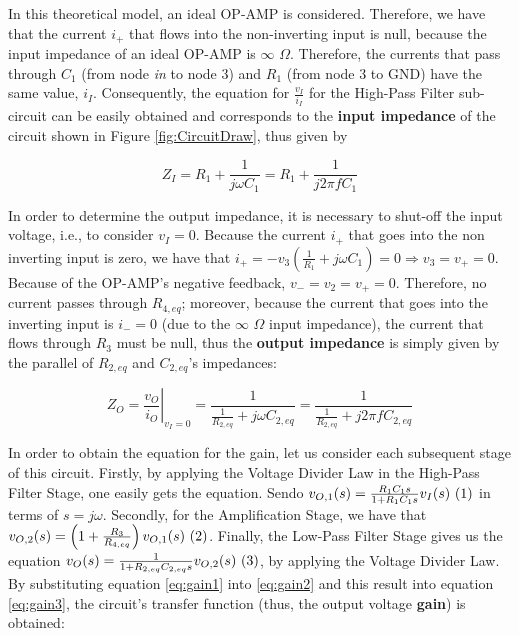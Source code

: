 \par

In this theoretical model, an ideal OP-AMP is considered. Therefore, we have that the current $i_+$ that flows into the non-inverting input is null, because the input impedance of an ideal OP-AMP is $\infty$ $\Omega$. Therefore, the currents that pass through $C_1$ (from node \textit{in} to node 3) and $R_1$ (from node 3 to GND) have the same value, $i_I$. Consequently, the equation for $\frac{v_I}{i_I}$ for the High-Pass Filter sub-circuit can be easily obtained and corresponds to the \textbf{input impedance} of the circuit shown in Figure \ref{fig:CircuitDraw}, thus given by

\begin{equation} \label{eq:input_impedance}
  Z_I=R_1+\frac{1}{j\omega C_1}=R_1+\frac{1}{j2\pi fC_1}
\end{equation}

In order to determine the output impedance, it is necessary to shut-off the input voltage, i.e., to consider $v_I=0$. Because the current $i_+$ that goes into the non inverting input is zero, we have that $i_+=-v_3\left(\frac{1}{R_1}+j\omega C_1\right)=0\Rightarrow v_3=v_+=0$. Because of the OP-AMP's negative feedback, $v_-=v_2=v_+=0$. Therefore, no current passes through $R_{4,eq}$; moreover, because the current that goes into the inverting input is $i_-=0$ (due to the $\infty$ $\Omega$ input impedance), the current that flows through $R_3$ must be null, thus the \textbf{output impedance} is simply given by the parallel of $R_{2,eq}$ and $C_{2,eq}$'s impedances:

\begin{equation} \label{eq:output_impedance}
  Z_O=\left.\frac{v_O}{i_O}\right|_{v_I=0}=\frac{1}{\frac{1}{R_{2,eq}}+j\omega C_{2,eq}}=\frac{1}{\frac{1}{R_{2,eq}}+j2\pi fC_{2,eq}}
\end{equation}

In order to obtain the equation for the gain, let us consider each subsequent stage of this circuit. Firstly, by applying the Voltage Divider Law in the High-Pass Filter Stage, one easily gets the equation. Sendo $v_{O,1}(s)=\frac{R_1C_1s}{1+R_1C_1s}v_I(s)~\refstepcounter{equation}(\theequation) \label{eq:gain1}$ in terms of $s=j\omega$. Secondly, for the Amplification Stage, we have that $v_{O,2}(s)=\left(1+\frac{R_3}{R_{4,eq}}\right)v_{O,1}(s)~\refstepcounter{equation}(\theequation) \label{eq:gain2}$. Finally, the Low-Pass Filter Stage gives us the equation $v_O(s)=\frac{1}{1+R_{2,eq}C_{2,eq}s}v_{O,2}(s)~\refstepcounter{equation}(\theequation) \label{eq:gain3}$, by applying the Voltage Divider Law. By substituting equation \ref{eq:gain1} into \ref{eq:gain2} and this result into equation \ref{eq:gain3}, the circuit's transfer function (thus, the output voltage \textbf{gain}) is obtained:

